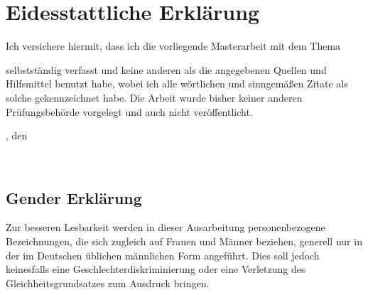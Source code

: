 \chapter*{Eidesstattliche Erklärung} %

Ich versichere hiermit, dass ich die vorliegende Masterarbeit mit dem Thema
\begin{quote}
    \textit{\titleDocument}
\end{quote}
selbstständig verfasst und keine anderen als die angegebenen Quellen und Hilfsmittel benutzt habe, wobei ich alle wörtlichen und sinngemäßen Zitate als solche gekennzeichnet habe.
Die Arbeit wurde bisher keiner anderen Prüfungsbehörde vorgelegt und auch nicht veröffentlicht.

\vspace*{2cm}

\begingroup
\setlength{\parindent}{0pt} %

\locationDocument, den \dateDocument
\bigskip
\bigskip

\newlength{\widthbox}
\settowidth{\widthbox}{\locationDocument, den \dateDocument}

\makebox[\widthbox]{\hrulefill}\\
\authorDocument
\endgroup

\vspace*{\fill}
\section*{Gender Erklärung}\label{sec:gender-erklärung}
Zur besseren Lesbarkeit werden in dieser Ausarbeitung personenbezogene Bezeichnungen, die sich zugleich auf Frauen und Männer beziehen, generell nur in der im Deutschen üblichen männlichen Form angeführt.
Dies soll jedoch keinesfalls eine Geschlechterdiskriminierung oder eine Verletzung des Gleichheitsgrundsatzes zum Ausdruck bringen.